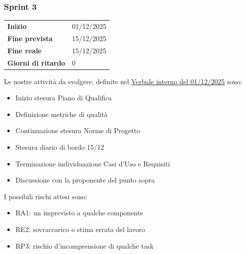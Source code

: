 \subsubsection{Sprint 3}


\begin{tabular}{p{} p{}}
	\textbf{Inizio} & 01/12/2025 \\
	\textbf{Fine prevista} & 15/12/2025 \\
	\textbf{Fine reale} & 15/12/2025 \\
	\textbf{Giorni di ritardo} & 0
\end{tabular}
\newline \newline 
Le nostre attività da svolgere, definite nel \href{https://nullpointersgroup.github.io/Documentazione/output/RTB/Verbali%20Interni/2025-12-01_verbale_interno.pdf}{Verbale interno del 01/12/2025} sono:
\begin{itemize}[itemsep=5pt, parsep=1pt, label=$\scriptstyle\bullet$]
	\item Inizio stesura Piano di Qualifica
	\item Definizione metriche di qualità
	\item Continuazione stesura Norme di Progetto
	\item Stesura diario di bordo 15/12
	\item Terminazione individuazione Casi d'Uso e Requisiti
	\item Discussione con la proponente del punto sopra
\end{itemize}


I possibili rischi attesi sono:
\begin{itemize}[itemsep=5pt, parsep=1pt, label=$\scriptstyle\bullet$]
	\item RA1: un imprevisto a qualche componente
	\item RE2: sovraccarico o stima errata del lavoro
	\item RP3: rischio d'incomprensione di qualche task
\end{itemize}


